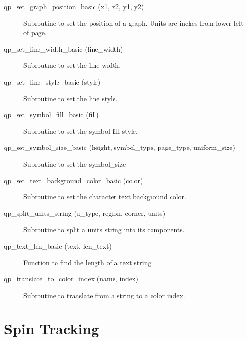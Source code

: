 \begin{description}
\label{r:qp.set.graph.position.basic}
\item[qp_set_graph_position_basic (x1, x2, y1, y2)] \Newline 
Subroutine to set the position of a graph.
Units are inches from lower left of page.

\label{r:qp.set.line.width.basic}
\item[qp_set_line_width_basic (line_width)] \Newline 
Subroutine to set the line width.

\label{r:qp.set.line.style.basic}
\item[qp_set_line_style_basic (style)] \Newline 
Subroutine to set the line style.

\label{r:qp.set.symbol.fill.basic}
\item[qp_set_symbol_fill_basic (fill)] \Newline 
Subroutine to set the symbol fill style.

\label{r:qp.set.symbol.size.basic}
\item[qp_set_symbol_size_basic (height, symbol_type, page_type, uniform_size)] \Newline 
Subroutine to set the symbol_size

\label{r:qp.set.text.background.color.basic}
\item[qp_set_text_background_color_basic (color)] \Newline 
Subroutine to set the character text background color.

\label{r:qp.split.units.string}
\item[qp_split_units_string (u_type, region, corner, units)] \Newline 
     Subroutine to split a units string into its components.

\label{r:qp.text.len.basic}
\item[qp_text_len_basic (text, len_text)] \Newline 
Function to find the length of a text string.

\label{r:qp.translate.to.color.index}
\item[qp_translate_to_color_index (name, index)] \Newline 
     Subroutine to translate from a string to a color index.

\end{description}

\section{Spin Tracking}
\label{r:spin}    

